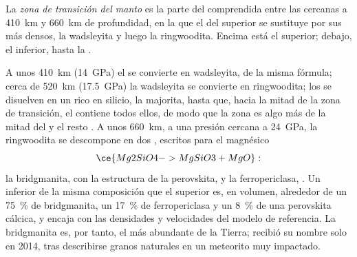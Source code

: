\begin{definition}\label{def:b1:layered-earth:transition-zone}
La \emph{zona de transición del manto} es la parte del  comprendida entre las
 cercanas a \qty{410}{km} y \qty{660}{km} de profundidad, en la que el  del  superior se
sustituye por sus  más densos, la wadsleyita y luego la ringwoodita. Encima está el  superior; debajo, el 
inferior, hasta la .
\end{definition}
A unos \qty{410}{km} (\qty{14}{GPa}) el   se convierte en wadsleyita, de la misma fórmula; cerca de
\qty{520}{km} (\qty{17.5}{GPa}) la wadsleyita se convierte en ringwoodita; los  se disuelven en un  rico en
silicio, la majorita, hasta que, hacia la mitad de la zona de transición, el  contiene todos ellos, de modo que la zona es
algo más de la mitad  del  y el resto . A unos \qty{660}{km}, a una presión cercana a \qty{24}{GPa}, la
ringwoodita se descompone en dos , escritos para el  magnésico
\[
  \ce{Mg2SiO4 -> MgSiO3 + MgO}:
\]
la bridgmanita,  con la estructura de la perovskita, y la ferropericlasa, . Un  inferior de la
misma composición que el  superior es, en volumen, alrededor de un \qty{75}{\percent} de bridgmanita, un \qty{17}{\percent}
de ferropericlasa y un \qty{8}{\percent} de una perovskita cálcica, y encaja con las densidades y velocidades del modelo de
referencia. La bridgmanita es, por tanto, el  más abundante de la Tierra; recibió su nombre solo en 2014, tras describirse
granos naturales en un meteorito muy impactado.

